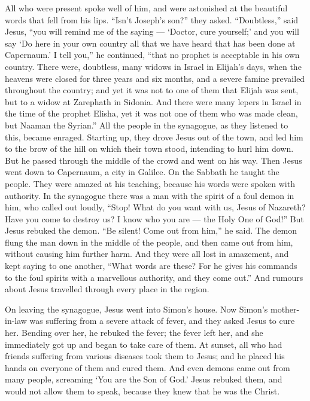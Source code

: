  All who were present spoke well of him, and were
astonished at the beautiful words that fell from his lips. ``Isn't
Joseph's son?'' they asked.  ``Doubtless,'' said Jesus,
``you will remind me of the saying --- `Doctor, cure yourself;' and you
will say `Do here in your own country all that we have heard that has
been done at Capernaum.'  I tell you,'' he continued,
``that no prophet is acceptable in his own country.  There
were, doubtless, many widows in Israel in Elijah's days, when the
heavens were closed for three years and six months, and a severe famine
prevailed throughout the country;  and yet it was not to
one of them that Elijah was sent, but to a widow at Zarephath in
Sidonia.  And there were many lepers in Israel in the time
of the prophet Elisha, yet it was not one of them who was made clean,
but Naaman the Syrian.''  All the people in the synagogue,
as they listened to this, became enraged.  Starting up,
they drove Jesus out of the town, and led him to the brow of the hill on
which their town stood, intending to hurl him down.  But he
passed through the middle of the crowd and went on his way.
 Then Jesus went down to Capernaum, a city in Galilee. On
the Sabbath he taught the people.  They were amazed at his
teaching, because his words were spoken with authority.  In
the synagogue there was a man with the spirit of a foul demon in him,
who called out loudly,  ``Stop! What do you want with us,
Jesus of Nazareth? Have you come to destroy us? I know who you are ---
the Holy One of God!''  But Jesus rebuked the demon. ``Be
silent! Come out from him,'' he said. The demon flung the man down in
the middle of the people, and then came out from him, without causing
him further harm.  And they were all lost in amazement, and
kept saying to one another, ``What words are these? For he gives his
commands to the foul spirits with a marvellous authority, and they come
out.''  And rumours about Jesus travelled through every
place in the region.

 On leaving the synagogue, Jesus went into Simon's house.
Now Simon's mother-in-law was suffering from a severe attack of fever,
and they asked Jesus to cure her.  Bending over her, he
rebuked the fever; the fever left her, and she immediately got up and
began to take care of them.  At sunset, all who had friends
suffering from various diseases took them to Jesus; and he placed his
hands on everyone of them and cured them.  And even demons
came out from many people, screaming `You are the Son of God.' Jesus
rebuked them, and would not allow them to speak, because they knew that
he was the Christ.

